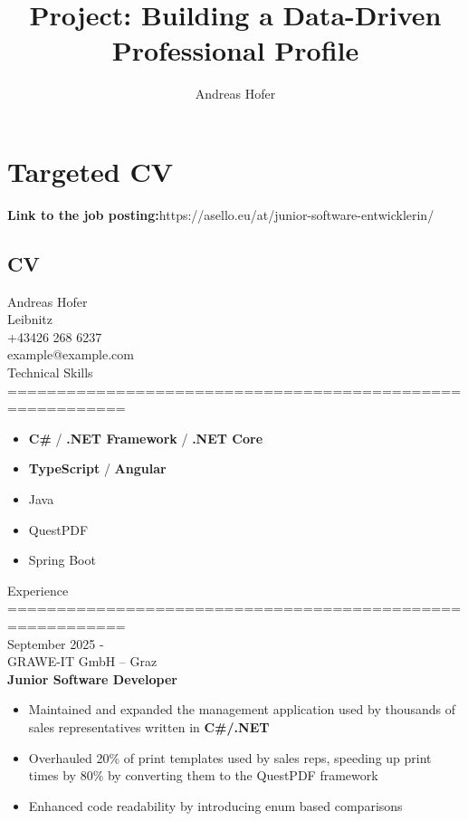 \documentclass{article}
\title{\vspace{-1cm}Project: Building a Data-Driven Professional Profile}
\author{Andreas Hofer}
\begin{document}
	\maketitle
	\tableofcontents
	\newpage
	\section{Targeted CV}
	\textbf{Link to the job posting:}https://asello.eu/at/junior-software-entwicklerin/ \\
	\subsection{CV}
	\newpage
	Andreas Hofer \\
	Leibnitz \\
	+43426 268 6237 \\
	example@example.com \\
	Technical Skills \\
	==========================================================

	\begin{itemize}
		\item{\textbf{C\#} / \textbf{.NET Framework} / \textbf{.NET Core}}
		\item{\textbf{TypeScript} / \textbf{Angular}}
		\item{Java}
		\item{QuestPDF}
		\item{Spring Boot}
	\end{itemize}

	Experience \\

	========================================================== \\
	September 2025 - \\
	GRAWE-IT GmbH – Graz \\
	\textbf{Junior Software Developer}
	\begin{itemize}
		\item{Maintained and expanded the management application used by thousands of sales representatives written in \textbf{C\#/.NET}}
		\item{Overhauled 20\% of print templates used by sales reps, speeding up print times by 80\% by converting them to the QuestPDF framework}
		\item{Enhanced code readability by introducing enum based comparisons}
	\end{itemize}
\end{document}
